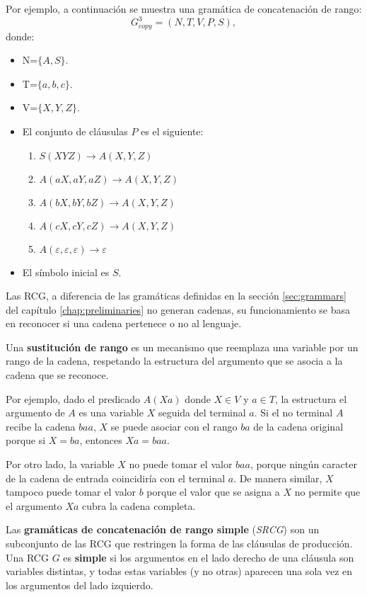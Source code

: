 Por ejemplo, a continuación se muestra una gramática de concatenación de rango:
\label{g_3copy}
\[
    G^3_{copy} = (N, T, V, P, S),
\]
donde:

\begin{itemize}
    \item  N=$\{A,S\}$.
    \item T=$\{a,b,c\}$.
    \item V=$\{X,Y,Z\}$.
    \item El conjunto de cláusulas $P$ es el siguiente:
          \begin{enumerate}
              \item $S(XYZ)\to A(X,Y,Z)$
              \item $A(aX,aY,aZ)\to A(X,Y,Z)$
              \item $A(bX,bY,bZ)\to A(X,Y,Z)$
              \item $A(cX,cY,cZ)\to A(X,Y,Z)$
              \item $A(\varepsilon,\varepsilon,\varepsilon)\to \varepsilon$
          \end{enumerate}
    \item El símbolo inicial es $S$.
\end{itemize}


Las RCG, a diferencia de las gramáticas definidas en la sección \ref{sec:grammars} del capítulo \ref{chap:preliminaries} no generan cadenas, su funcionamiento se basa en reconocer si una cadena pertenece o no al lenguaje.

\begin{definition}
    Una \textbf{sustitución de rango} es un mecanismo que reemplaza una variable por un 
    rango de la cadena, respetando la estructura del argumento que se asocia a la cadena que se reconoce. 
\end{definition}

Por ejemplo, dado el predicado $A(Xa)$ donde $X \in V$ y $a \in T$, la estructura el argumento de $A$ es una variable $X$ seguida del terminal $a$. Si el no terminal $A$ recibe la cadena $baa$, $X$ se puede asociar con el rango $ba$ de la cadena original porque si $X=ba$, entonces $Xa=baa$.

Por otro lado, la variable $X$ no puede tomar el valor $baa$, porque ningún caracter de la cadena de entrada coincidiría 
con el terminal $a$. De manera similar, $X$ tampoco puede tomar el valor $b$ porque el valor que se asigna a $X$ no permite que el argumento $Xa$ cubra la cadena completa.

\begin{definition}
    Las \textbf{gramáticas de concatenación de rango simple}
    (\textit{SRCG}) son un subconjunto de las RCG que restringen la forma de las cláusulas de producción.  
    Una RCG $G$ es \textbf{simple} si los argumentos en el lado derecho de una cláusula son variables distintas, 
    y todas estas variables (y no otras) aparecen una sola vez en los argumentos del lado izquierdo.  
\end{definition}


